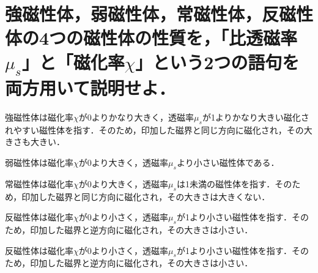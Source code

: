 \documentclass[dvipdfmx]{ujarticle}
\begin{document}
\section{強磁性体，弱磁性体，常磁性体，反磁性体の4つの磁性体の性質を，「比透磁率$\mu_{s}$」と「磁化率$\chi$」という2つの語句を両方用いて説明せよ．}
強磁性体は磁化率$\chi$が0よりかなり大きく，透磁率$\mu_{s}$が1よりかなり大きい磁化されやすい磁性体を指す．そのため，印加した磁界と同じ方向に磁化され，その大きさも大きい．

弱磁性体は磁化率$\chi$が0より大きく，透磁率$\mu_{s}$より小さい磁性体である．

常磁性体は磁化率$\chi$が0より大きく，透磁率$\mu_{s}$は1未満の磁性体を指す．そのため，印加した磁界と同じ方向に磁化され，その大きさは大きくない．

反磁性体は磁化率$\chi$が0より小さく，透磁率$\mu_{s}$が1より小さい磁性体を指す．そのため，印加した磁界と逆方向に磁化され，その大きさは小さい．

反磁性体は磁化率$\chi$が0より小さく，透磁率$\mu_{s}$が1より小さい磁性体を指す．そのため，印加した磁界と逆方向に磁化され，その大きさは小さい．
\end{document}
